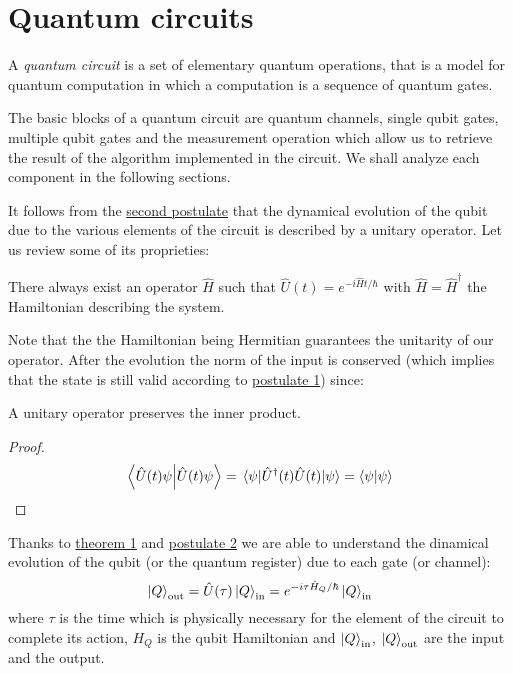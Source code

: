 \section{Quantum circuits}
A \emph{quantum circuit} is a set of elementary quantum operations, that is a model for quantum computation in which a computation is a sequence of quantum gates.

The basic blocks of a quantum circuit are quantum channels, single qubit gates, multiple qubit gates and the measurement operation which allow us to retrieve the result of the algorithm implemented in the circuit. We shall analyze each component in the following sections.

It follows from the \hyperref[postulate:2]{second postulate} that the dynamical evolution of the qubit due to the various elements of the circuit is described by a unitary operator. Let us review some of its proprieties: 
\begin{theorem}\label{theorem:1}
There always exist an operator $\hat{H}$ such that $\hat{U}(t) = e^{-i\hat{H}t/\hbar}$ with $\hat{H} = \hat{H}^\dagger$ the Hamiltonian describing the system. \cite[p.145]{Shankar}
\end{theorem}

Note that the the Hamiltonian being Hermitian guarantees the unitarity of our operator. After the evolution the norm of the input is conserved (which implies that the state is still valid according to \hyperref[postulate:1]{postulate 1}) since:
\begin{theorem}
A unitary operator preserves the inner product.
\end{theorem}
\begin{proof}
\begin{equation*}
    \bra{\hat{U}(t)\psi}\ket{\hat{U}(t)\psi} = \expval{\hat{U}^\dagger(t)\hat{U}(t)}{\psi} = \braket{\psi}
\end{equation*}
\end{proof}

Thanks to \hyperref[theorem:1]{theorem 1} and \hyperref[postulate:2]{postulate 2} we are able to understand the dinamical evolution of the qubit (or the quantum register) due to each gate (or channel):
\begin{equation}\label{eq:evolution}
     \ket{Q}_\text{out} = \hat{U}(\tau) \ket{Q}_\text{in} = e^{-i\tau\hat{H}_Q/\hbar} \ket{Q}_\text{in}
\end{equation}
where $\tau$ is the time which is physically necessary for the element of the circuit to complete its action, $H_Q$ is the qubit Hamiltonian and $\ket{Q}_\text{in}$, $\ket{Q}_\text{out}$ are the input and the output.
